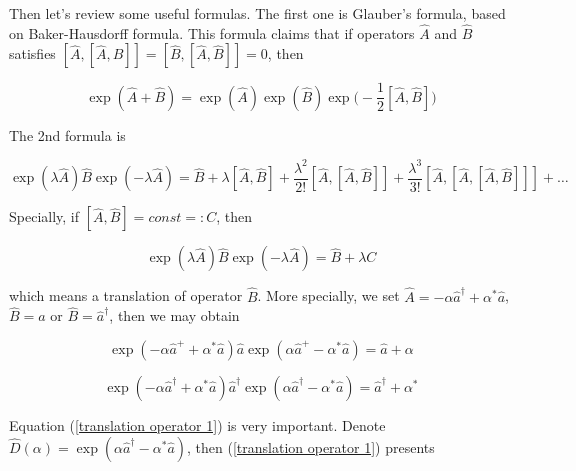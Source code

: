 \documentclass{article}
\begin{document}
        \vbox{}

        \vbox{}

        Then let's review some useful formulas. The first one is Glauber's formula, based on Baker-Hausdorff formula. This formula claims that if operators $\hat{A}$ and $\hat{B}$ satisfies $[\hat{A}, [\hat{A}, \hat{B}]] = [\hat{B}, [\hat{A}, \hat{B}]] = 0$, then 

        \begin{equation}\label{formula1}
            \exp(\hat{A}+\hat{B}) = \exp(\hat{A})\exp(\hat{B})\exp\biggl(-\frac{1}{2}[\hat{A}, \hat{B}]\biggr)
        \end{equation}

        The 2nd formula is 

        \begin{equation}\label{formula2}
            \exp(\lambda\hat{A})\hat{B}\exp(-\lambda\hat{A}) = \hat{B} + \lambda [\hat{A},\hat{B}] + \frac{\lambda^2}{2!} [\hat{A}, [\hat{A}, \hat{B}]] + \frac{\lambda^3}{3!}[\hat{A}, [\hat{A}, [\hat{A}, \hat{B}]]] + \dots
        \end{equation}

        Specially, if $[\hat{A}, \hat{B}]=const=:C$, then 

        \begin{equation}
            \exp(\lambda\hat{A})\hat{B}\exp(-\lambda\hat{A}) = \hat{B} + \lambda C
        \end{equation}

        which means a translation of operator $\hat{B}$. More specially, we set $\hat{A}=-\alpha\hat{a}^\dagger+\alpha^*\hat{a}$, $\hat{B}=\hat{a}$ or $\hat{B}=\hat{a}^\dagger$, then we may obtain 

        \begin{equation}\label{translation operator 1}
            \exp(-\alpha\hat{a}^++\alpha^*\hat{a})\hat{a}\exp(\alpha\hat{a}^+-\alpha^*\hat{a}) = \hat{a}+\alpha
        \end{equation}

        \begin{equation}
            \exp(-\alpha\hat{a}^\dagger+\alpha^*\hat{a})\hat{a}^\dagger\exp(\alpha\hat{a}^\dagger-\alpha^*\hat{a}) = \hat{a}^\dagger+\alpha^*
        \end{equation}

        Equation (\ref{translation operator 1}) is very important. Denote $\hat{D}(\alpha)=\exp(\alpha\hat{a}^\dagger -\alpha^*\hat{a})$, then (\ref{translation operator 1}) presents
\end{document}
